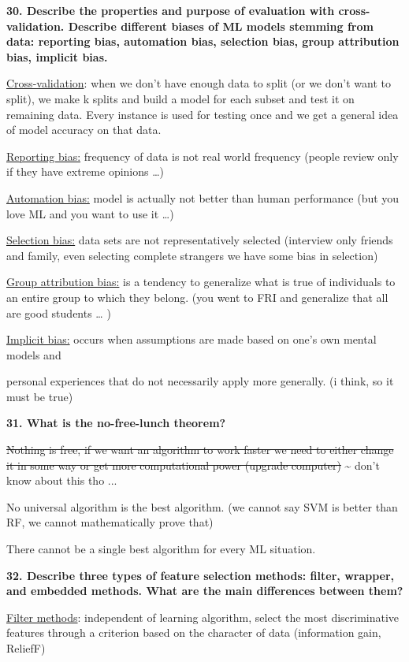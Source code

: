 \textbf{30. Describe the properties and purpose of evaluation with
cross-validation. Describe different biases of ML models stemming from
data: reporting bias, automation bias, selection bias, group attribution
bias, implicit bias.}

\underline{Cross-validation}: when we don't have enough data to split
(or we don't want to split), we make k splits and build a model for each
subset and test it on remaining data. Every instance is used for testing
once and we get a general idea of model accuracy on that data.

\underline{Reporting bias:} frequency of data is not real world
frequency (people review only if they have extreme opinions \ldots)

\underline{Automation bias:} model is actually not better than human
performance (but you love ML and you want to use it \ldots)

\underline{Selection bias:} data sets are not representatively selected
(interview only friends and family, even selecting complete strangers we
have some bias in selection)

\underline{Group attribution bias:} is a tendency to generalize what is
true of individuals to an entire group to which they belong. (you went
to FRI and generalize that all are good students \ldots{} )

\underline{Implicit bias:} occurs when assumptions are made based on
one's own mental models and

personal experiences that do not necessarily apply more generally. (i
think, so it must be true)

\textbf{31. What is the no-free-lunch theorem?}

\sout{Nothing is free, if we want an algorithm to work faster we need to
either change it in some way or get more computational power (upgrade
computer)} \textasciitilde{} don't know about this tho ...

No universal algorithm is the best algorithm. (we cannot say SVM is
better than RF, we cannot mathematically prove that)

There cannot be a single best algorithm for every ML situation.

\textbf{32. Describe three types of feature selection methods: filter,
wrapper, and embedded methods. What are the main differences between
them?}

\underline{Filter methods}: independent of learning algorithm, select
the most discriminative features through a criterion based on the
character of data (information gain, ReliefF)

